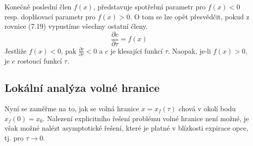\documentclass[a4paper]{book}
\begin{document}
Konečně poslední člen $f(x)$, představuje spotřební parametr pro $f(x) < 0$ resp. doplňovací parametr pro $f(x) > 0$. O tom se lze opět přesvědčit, pokud z rovnice (7.19) vypustíme všechny ostatní členy.
\begin{equation*}
\frac{\partial c}{\partial \tau} = f(x)
\end{equation*}
Jestliže $f(x) < 0$, pak $\frac{\partial c}{\partial \tau} < 0$ a $c$ je klesající funkcí $\tau$. Naopak, je-li $f(x) > 0$, je $c$ rostoucí funkcí $\tau$.

\subsection{Lokální analýza volné hranice}

Nyní se zaměřme na to, jak se volná hranice $x = x_f(\tau)$ chová v okolí bodu $x_f(0) = x_0$. Nalezení explicitního řešení problému volné hranice není možné, je však možné nalézt asymptotické řešení, které je platné v blízkosti expirace opce, tj. pro $\tau \rightarrow 0$.
\end{document}

